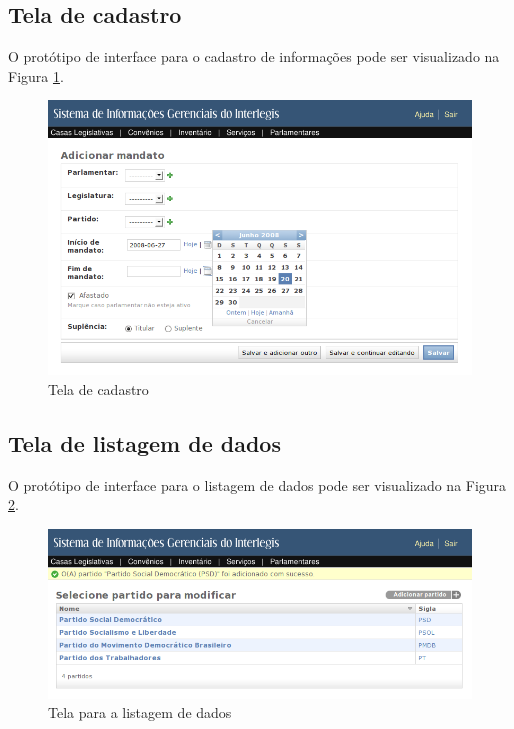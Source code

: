\subsection{Tela de cadastro}
O protótipo de interface para o cadastro de informações pode ser
visualizado na Figura \ref{fig:cadastro}.

\begin{figure}[h]
  \centering
  \includegraphics[width=120mm]{../imagens/cadastro.png}
  \caption{Tela de cadastro}
  \label{fig:cadastro}
\end{figure}

\subsection{Tela de listagem de dados}
O protótipo de interface para o listagem de dados pode ser visualizado
na Figura \ref{fig:listagem}.

\begin{figure}[h]
  \centering
  \includegraphics[width=120mm]{../imagens/listagem.png}
  \caption{Tela para a listagem de dados}
  \label{fig:listagem}
\end{figure}

%
%

